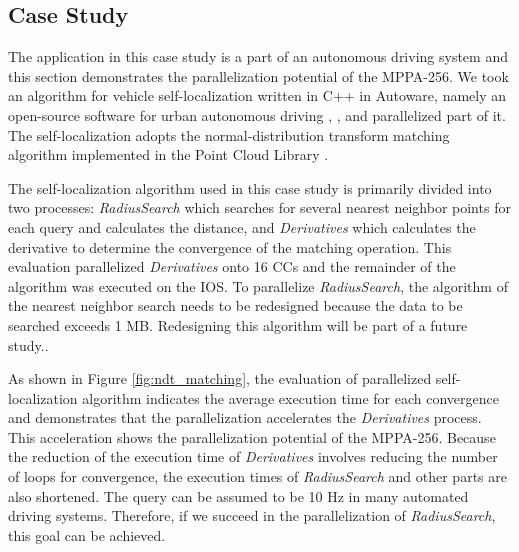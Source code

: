 \documentclass{sig-alternate-05-2015}
\begin{document}
\subsection{Case Study}
\label{sec:case_study}
The application in this case study is a part of an autonomous driving system and this section demonstrates the parallelization potential of the MPPA-256.
We took an algorithm for vehicle self-localization written in C++ in Autoware, namely an open-source software for urban autonomous driving \cite{autoware}, \cite{kato2015open}, and parallelized part of it.
The self-localization adopts the normal-distribution transform matching algorithm \cite{magnusson2009three} implemented in the Point Cloud Library \cite{pcl}.

The self-localization algorithm used in this case study is primarily divided into two processes: \emph{RadiusSearch} which searches for several nearest neighbor points for each query and calculates the distance, and \emph{Derivatives} which calculates the derivative to determine the convergence of the matching operation.
This evaluation parallelized \emph{Derivatives} onto 16 CCs and the remainder of the algorithm was executed on the IOS.
To parallelize \emph{RadiusSearch}, the algorithm of the nearest neighbor search needs to be redesigned because the data to be searched exceeds 1 MB.
Redesigning this algorithm will be part of a future study..

As shown in Figure \ref{fig:ndt_matching}, the evaluation of parallelized self-localization algorithm indicates the average execution time for each convergence and demonstrates that the parallelization accelerates the \emph{Derivatives} process.
This acceleration shows the parallelization potential of the MPPA-256.
Because the reduction of the execution time of \emph{Derivatives} involves reducing the number of loops for convergence, the execution times of \emph{RadiusSearch} and other parts are also shortened.
The query can be assumed to be 10 Hz in many automated driving systems.
Therefore, if we succeed in the parallelization of \emph{RadiusSearch}, this goal can be achieved.
\end{document}
